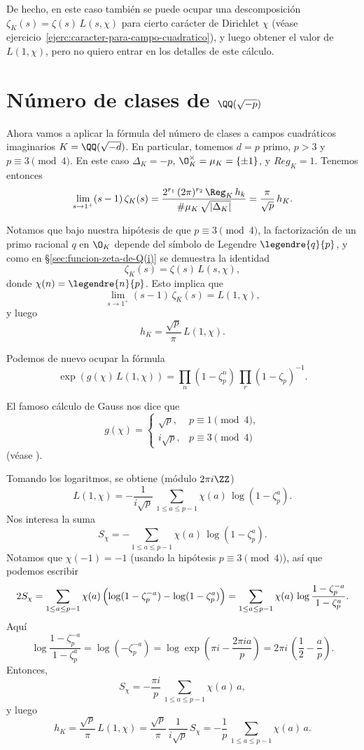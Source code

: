 De hecho, en este caso también se puede ocupar una descomposición
$\zeta_K (s) = \zeta (s) \, L (s,\chi)$ para cierto carácter de Dirichlet $\chi$
(véase ejercicio~\ref{ejerc:caracter-para-campo-cuadratico}), y luego obtener
el valor de $L (1,\chi)$, pero no quiero entrar en los detalles de este cálculo.


\section{Número de clases de \texorpdfstring{$\QQ (\sqrt{-p})$}{ℚ(√−p)}}

Ahora vamos a aplicar la fórmula del número de clases a campos cuadráticos
imaginarios $K = \QQ (\sqrt{-d})$. En particular, tomemos $d = p$ primo, $p > 3$
y $p \equiv 3 \pmod{4}$. En este caso $\Delta_K = -p$, $\O_K^\times = \mu_K = \{ \pm 1 \}$,
y $Reg_K = 1$. Tenemos entonces
\[ \lim_{s \to 1^+} (s - 1)\,\zeta_K (s) =
   \frac{2^{r_1}\,(2\pi)^{r_2}\,\Reg_K\,h_k}{\#\mu_K\,\sqrt{|\Delta_K|}} =
   \frac{\pi}{\sqrt{p}}\,h_K. \]

Notamos que bajo nuestra hipótesis de que $p \equiv 3\pmod{4}$, la factorización
de un primo racional $q$ en $\O_K$ depende del símbolo de Legendre
$\legendre{q}{p}$, y como en \S\ref{sec:funcion-zeta-de-Q(i)} se demuestra la
identidad
$$\zeta_K (s) = \zeta (s)\,L (s,\chi),$$
donde $\chi (n) = \legendre{n}{p}$. Esto implica que
$$\lim_{s \to 1^+} (s - 1)\,\zeta_K (s) = L (1,\chi),$$
y luego
$$h_K = \frac{\sqrt{p}}{\pi}\,L (1,\chi).$$

Podemos de nuevo ocupar la fórmula
$$\exp (g (\chi)\,L(1,\chi)) = \prod_n (1 - \zeta_p^n)\,\prod_r (1 - \zeta_p)^{-1}.$$

El famoso cálculo de Gauss nos dice que
\[ g (\chi) = \begin{cases}
  \sqrt{p}, & p \equiv 1 \pmod{4},\\
  i\sqrt{p}, & p \equiv 3 \pmod{4}
\end{cases} \]
(véase \cite[Chapter~6]{Ireland-Rosen}).

Tomando los logaritmos, se obtiene (módulo $2\pi i\ZZ$)
$$L(1,\chi) = -\frac{1}{i\sqrt{p}}\,\sum_{1 \le a \le p-1} \chi (a)\,\log (1 - \zeta_p^a).$$
Nos interesa la suma
$$S_\chi = -\sum_{1 \le a \le p-1} \chi (a)\,\log (1 - \zeta_p^a).$$
Notamos que $\chi (-1) = -1$ (usando la hipótesis $p \equiv 3 \pmod{4}$),
así que podemos escribir
\[ 2 S_\chi = \sum_{1 \le a \le p-1} \chi (a)\,\Bigl(\log (1 - \zeta_p^{-a}) - \log (1 - \zeta_p^a)\Bigr) =
   \sum_{1 \le a \le p-1} \chi (a)\,\log \frac{1 - \zeta_p^{-a}}{1 - \zeta_p^a}. \]
Aquí
\[ \log \frac{1 - \zeta_p^{-a}}{1 - \zeta_p^a} =
   \log (-\zeta_p^{-a}) =
   \log \exp \left(\pi i - \frac{2\pi i a}{p}\right) =
   2\pi i\,\left(\frac{1}{2} - \frac{a}{p}\right). \]
Entonces,
$$S_\chi = -\frac{\pi i}{p}\,\sum_{1 \le a \le p-1} \chi (a)\,a,$$
y luego
\[ h_K = \frac{\sqrt{p}}{\pi}\,L(1,\chi) =
   \frac{\sqrt{p}}{\pi}\,\frac{1}{i\sqrt{p}}\,S_\chi =
   -\frac{1}{p}\,\sum_{1 \le a \le p-1} \chi (a)\,a. \]

